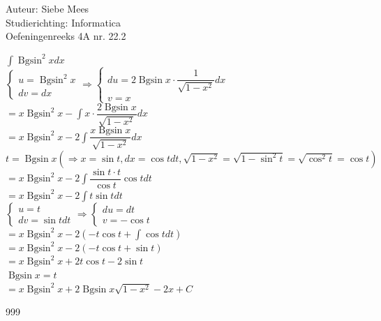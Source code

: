 \documentclass[a4paper]{article}
\newcommand{\Bgsin}{\operatorname{Bgsin}}
\begin{document}
  
\noindent \large Auteur: Siebe Mees \\
\noindent \large Studierichting: Informatica\\
\noindent \large Oefeningenreeks 4A nr. 22.2\\

\medskip

\normalsize

$ \displaystyle\int \Bgsin^2 x dx $\\

$ \left \{
\begin{array}{l}
u = \Bgsin^2 x \\
dv = dx
\end{array}
\right .
\Rightarrow
\left \{
\begin{array}{l}
du = 2\Bgsin x \cdot \dfrac{1}{\sqrt{1-x^2}} dx \\
v = x
\end{array}
\right . $\\

$ = x\Bgsin^2 x - \displaystyle\int x \cdot \dfrac{2\Bgsin x}{\sqrt{1-x^2}} dx $\\

$ = x\Bgsin^2 x - 2\displaystyle\int \dfrac{x\Bgsin x}{\sqrt{1-x^2}} dx $\\

$ t = \Bgsin x \left( \Rightarrow x = \sin t, dx = \cos t dt, \sqrt{1-x^2} = \sqrt{1-\sin^2 t} = \sqrt{\cos^2 t} = \cos t \right)$\\

$ = x\Bgsin^2 x - 2\displaystyle\int \dfrac{\sin t \cdot t}{\cos t}\cos t dt $\\

$ = x\Bgsin^2 x - 2\displaystyle\int t\sin t dt $\\

$ \left \{
\begin{array}{l}
u = t \\
dv = \sin t dt
\end{array}
\right .
\Rightarrow
\left \{
\begin{array}{l}
du = dt \\
v = -\cos t
\end{array}
\right . $\\

$ = x\Bgsin^2 x - 2\left(-t\cos t + \displaystyle\int \cos t dt\right) $\\

$ = x\Bgsin^2 x - 2\left(-t\cos t + \sin t\right) $\\

$ = x\Bgsin^2 x + 2t\cos t - 2\sin t $\\

$ \Bgsin x = t $\\

$ = x\Bgsin^2 x + 2\Bgsin x\sqrt{1-x^2} - 2x + C $\\

\begin{thebibliography}{999}
\end{thebibliography}
\end{document}
